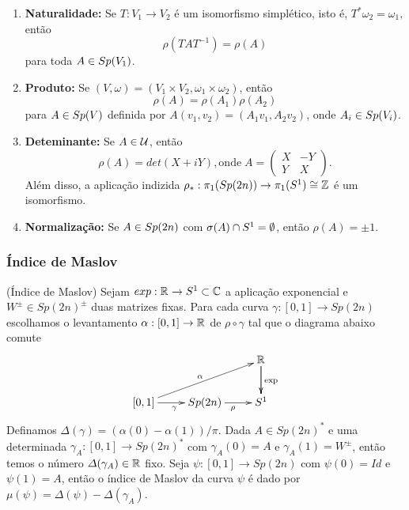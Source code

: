 \documentclass{beamer}
\begin{document}
	\begin{frame}
		\begin{enumerate}
			\item \textbf{Naturalidade:}  Se $T:V_{1} \to V_{2}$ é um isomorfismo simplético, isto é, $T^{*}\omega_{2} = \omega_{1}, $então 
			$$
			\rho(TAT^{-1}) = \rho(A)
			$$
			para toda $A\in Sp(V_{1})$.
			
			\item \textbf{Produto:} Se $(V,\omega) = (V_{1}\times V_{2},\omega_{1}\times \omega_{2})$, então
			$$
			\rho(A) = \rho(A_{1})\rho(A_{2})
			$$
			para $A\in Sp(V)$ definida por $A(v_{1}, v_{2})=(A_{1}v_{1}, A_{2}v_{2})$, onde $A_{i} \in Sp(V_{i})$.
			
			\item \textbf{Deteminante:} Se $A\in \mathcal{U}$, então 
			$$
			\rho(A) = det(X+iY), \text{onde} \;	
			A=\left(
			\begin{array}{cc}
			X & -Y					\\
			Y & X
			\end{array}
			\right).
			$$
			Além disso, a aplicação indizida $\rho_{*}: \pi_{1}(Sp(2n)) \to \pi_{1}(S^{1}) \cong \mathbb{Z}$ é um isomorfismo.
			
			\item \textbf{Normalização:} Se $A \in Sp(2n)$ com $\sigma(A)\cap S^{1} = \emptyset$, então $\rho(A) = \pm 1$.
		\end{enumerate}
	\end{frame}
	
	\begin{frame}
		\frametitle{Índice de Maslov}
		\begin{definicao}
			(Índice de Maslov) Sejam $exp:\mathbb{R}^{} \to S^{1} \subset \mathbb{C}$ a aplicação exponencial e $W^{\pm} \in Sp(2n)^{\pm}$ duas matrizes fixas. Para cada curva $\gamma:[0,1] \to Sp(2n)$ escolhamos o levantamento $\alpha:[0,1] \to \mathbb{R}^{}$ de $\rho\circ \gamma$ tal que o diagrama abaixo comute
			$$
			\xymatrix{
				& & \real{}\ar[d]\ar[d]^{\text{exp}}
				\\
				[0,1 ]\ar[urr]^{\alpha} \ar[r]_{\gamma} & Sp(2n) \ar[r]_{\rho} & S^{1}
			}
			$$	
			Definamos $\varDelta(\gamma) = (\alpha(0) - \alpha(1))/\pi$. Dada $A \in Sp(2n)^{*}$ e uma determinada $\gamma_{A}:[0,1] \to Sp(2n)^{*}$ com $\gamma_{A}(0) = A$ e $\gamma_{A}(1) = W^{\pm}$, então temos o número $\varDelta(\gamma_{A}) \in \mathbb{R}^{}$ fixo.
			Seja $\psi:[0,1] \to Sp(2n)$ com $\psi(0)=Id$ e $\psi(1)=A$, então o índice de Maslov da curva $\psi$ é dado por $\mu(\psi) = \varDelta(\psi) - \varDelta(\gamma_{A})$.
			
		\end{definicao}
		
	\end{frame}
	
\end{document}
